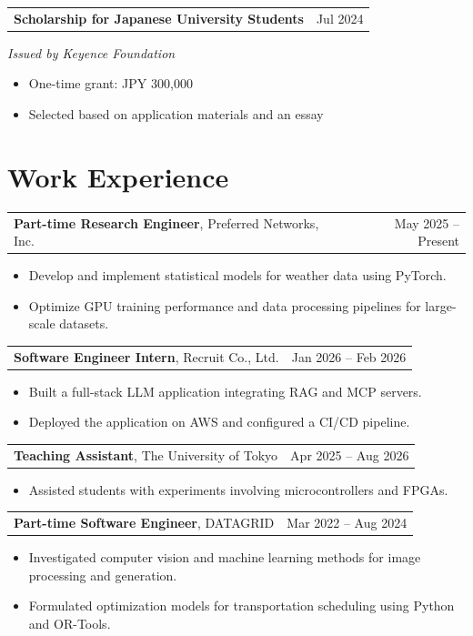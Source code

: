 \documentclass[11pt,a4paper]{article}
\makeatletter
\newenvironment{entry}[2]{%
  \par\addvspace{4pt}\noindent\begin{minipage}{\linewidth}
  \raggedright
  \begin{tabularx}{\linewidth}{@{}>{\raggedright\arraybackslash}X@{\hspace{12pt}}r@{}}
    #1 & #2
  \end{tabularx}\par\vspace{1pt}
}{\end{minipage}\par}
\makeatother
\begin{document}
\begin{entry}{\textbf{Scholarship for Japanese University Students}}{Jul 2024}
  \textit{Issued by Keyence Foundation}
  \begin{itemize}
    \item One-time grant: JPY 300,000
    \item Selected based on application materials and an essay
  \end{itemize}
\end{entry}


\section{Work Experience}
\begin{entry}{\textbf{Part-time Research Engineer}, Preferred Networks, Inc.}{May 2025 -- Present}
  \begin{itemize}
    \item Develop and implement statistical models for weather data using PyTorch.
    \item Optimize GPU training performance and data processing pipelines for large-scale datasets.
  \end{itemize}
\end{entry}
\begin{entry}{\textbf{Software Engineer Intern}, Recruit Co., Ltd.}{Jan 2026 -- Feb 2026}
  \begin{itemize}
    \item Built a full-stack LLM application integrating RAG and MCP servers.
    \item Deployed the application on AWS and configured a CI/CD pipeline.
  \end{itemize}
\end{entry}
\begin{entry}{\textbf{Teaching Assistant}, The University of Tokyo}{Apr 2025 -- Aug 2026}
  \begin{itemize}
    \item Assisted students with experiments involving microcontrollers and FPGAs.
  \end{itemize}
\end{entry}
\begin{entry}{\textbf{Part-time Software Engineer}, DATAGRID}{Mar 2022 -- Aug 2024}
  \begin{itemize}
    \item Investigated computer vision and machine learning methods for image processing and generation.
    \item Formulated optimization models for transportation scheduling using Python and OR-Tools.
  \end{itemize}
\end{entry}
\end{document}
